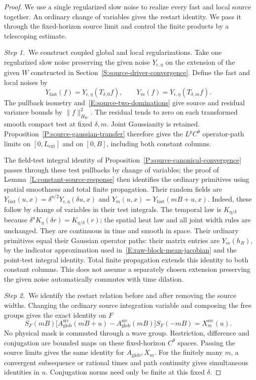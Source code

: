 \begin{proof}
  We use a single regularized slow noise to realize every fast and local
  source together. An ordinary change of variables gives the restart identity.
  We pass it through the fixed-horizon source limit and control the finite
  products by a telescoping estimate.


  \medskip
  \noindent\textit{Step 1.~}We construct coupled global and local
  regularizations.
  Take one regularized slow noise preserving the given noise $Y_{\epsilon,\eta}$
  on the extension of the given $W$ constructed in
  Section~\ref{S:source-driver-convergence}. Define the fast and local noises by
  \[
    Y_{\mathrm{fast}}(f)=Y_{\epsilon,\eta}(T_{\delta,0}f),\qquad
    Y_m(f)=Y_{\epsilon,\eta}(T_{\delta,m}f).
  \]
  The pullback isometry and~\eqref{E:source-two-dominations} give source and
  residual variance bounds by $\|f\|_{H_W}^2$. The residual tends to zero on
  each transformed smooth compact test at fixed $\delta,m$. Joint Gaussianity is
  retained. Proposition~\ref{P:source-gaussian-transfer} therefore gives the
  $L^pC^\theta$ operator-path limits on $[0,L_{\mathrm{ext}}]$ and on $[0,B]$,
  including both constant columns.

  The field-test integral identity of
  Proposition~\ref{P:source-canonical-convergence} passes through these test
  pullbacks by change of variables; the proof of
  Lemma~\ref{L:constant-source-response} then identifies the ordinary
  primitives using spatial smoothness and total finite propagation.
  Their random fields are $Y_{\mathrm{fast}}(u,x) =
  \delta^{a/2}Y_{\epsilon,\eta}(\delta u,x)$ and $Y_m(u,x) =
  Y_{\mathrm{fast}}(mB+u,x)$. Indeed, these follow by change of variables in
  their test integrals. The temporal law is $K_{\eta/\delta}$ because
  $\delta^aK_\eta(\delta r) = K_{\eta/\delta}(r)$; the spatial heat law and all
  joint width rules are unchanged. They are continuous in time and smooth in
  space. Their ordinary primitives equal their Gaussian operator paths: their
  matrix entries are $Y_m(h_R)$, by the indicator approximation used
  in~\eqref{E:raw-block-mean-jacobian} and the point-test integral identity.
  Total finite propagation extends this identity to both constant columns. This
  does not assume a separately chosen extension preserving the given noise
  automatically commutes with time dilation.


  \medskip
  \noindent\textit{Step 2.~}We identify the restart relation before and after
  removing the source widths.
  Changing the ordinary source integration variable and composing the free
  groups gives the exact identity on $F$
  \[
    S_F(mB)\big[A_{\mathrm{glob}}^{\mathrm{src}}(mB+u)
    -A_{\mathrm{glob}}^{\mathrm{src}}(mB)\big]
    S_F(-mB)=X_m^{\mathrm{src}}(u).
  \]
  No physical mask is commuted through a wave group. Restriction, difference and
  conjugation are bounded maps on these fixed-horizon $C^\theta$ spaces. Passing
  the source limits gives the same identity for $A_{\mathrm{glob}},X_m$. For the
  finitely many $m$, a convergent subsequence or rational times and path
  continuity gives simultaneous identities in $u$. Conjugation norms need only
  be finite at this fixed $\delta$.



\end{proof}
